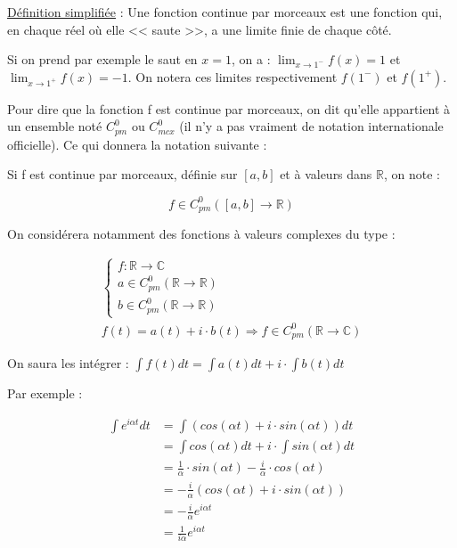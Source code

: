 \documentclass[12pt, a4paper]{article}
\begin{document}
\begin{tcolorbox}
	\underline{Définition simplifiée} : Une fonction continue par morceaux est une fonction qui, en chaque réel où elle << saute >>, a une limite finie de chaque côté.
\end{tcolorbox}

Si on prend par exemple le saut en $x = 1$, on a : $\displaystyle\lim_{x \to 1^-} f(x) = 1$ et $\displaystyle\lim_{x \to 1^+} f(x) = -1$. On notera ces limites respectivement $f(1^-)$ et $f(1^+)$.

Pour dire que la fonction f est continue par morceaux, on dit qu'elle appartient à un ensemble noté $C_{pm}^0$ ou $C_{mcx}^0$ (il n'y a pas vraiment de notation internationale officielle). Ce qui donnera la notation suivante :

\begin{tcolorbox}
	Si f est continue par morceaux, définie sur $[a,b]$ et à valeurs dans $\mathbb{R}$,  on note :
		
		\begin{equation*}
			f \in C_{pm}^0([a,b] \to \mathbb{R})
		\end{equation*}
\end{tcolorbox}



\clearpage



On considérera notamment des fonctions à valeurs complexes du type :

	\begin{align*}
		\begin{cases}
			f:\mathbb{R} \to \mathbb{C} \\
			a \in C_{pm}^0(\mathbb{R} \to \mathbb{R}) \\
			b \in C_{pm}^0(\mathbb{R} \to \mathbb{R})
		\end{cases} \\
		f(t) = a(t) + i \cdot b(t) \Rightarrow f \in C_{pm}^0(\mathbb{R} \to \mathbb{C})
	\end{align*}

On saura les intégrer : $\displaystyle\int f(t)dt = \int a(t)dt + i \cdot \int b(t)dt $ 

Par exemple :

	\begin{equation*}
		\begin{aligned}
			\int e^{i\alpha t} dt & = \int (cos(\alpha t) + i \cdot sin(\alpha t))dt \\
			{} & = \int cos(\alpha t) dt + i \cdot \int sin(\alpha t) dt \\
			{} & = \frac{1}{\alpha} \cdot sin(\alpha t) - \frac{i}{\alpha} \cdot cos(\alpha t) \\
			{} & = -\frac{i}{\alpha} ( cos(\alpha t) + i \cdot sin(\alpha t) ) \\
			{} & = -\frac{i}{\alpha} e^{i \alpha t} \\
			{} & = \frac{1}{i\alpha} e^{i\alpha t}
		\end{aligned}
	\end{equation*}
\end{document}

